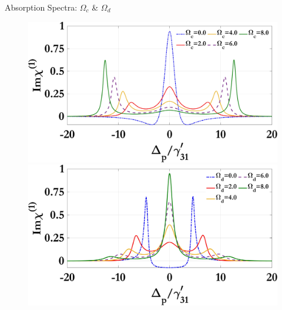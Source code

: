 \documentclass{beamer}
\begin{document}
\begin{frame}{Absorption Spectra: $\Omega_c$ \& $\Omega_d$}
  \vspace{-60pt}
  \begin{figure}[h]
    \centering
    \begin{minipage}{0.46\textwidth}
      \centering
      \includegraphics[width=\linewidth]{Assets/Img_chi1_Omega_c.jpeg}
      \subcaption{}
    \end{minipage}
    \hfill
    \begin{minipage}{0.46\textwidth}
      \centering
      \includegraphics[width=\linewidth]{Assets/Img_chi1_Omega_d.jpeg}
      \subcaption{}
    \end{minipage}\label{fig:imag-chi1}
   \end{figure}
\end{frame}
\end{document}
